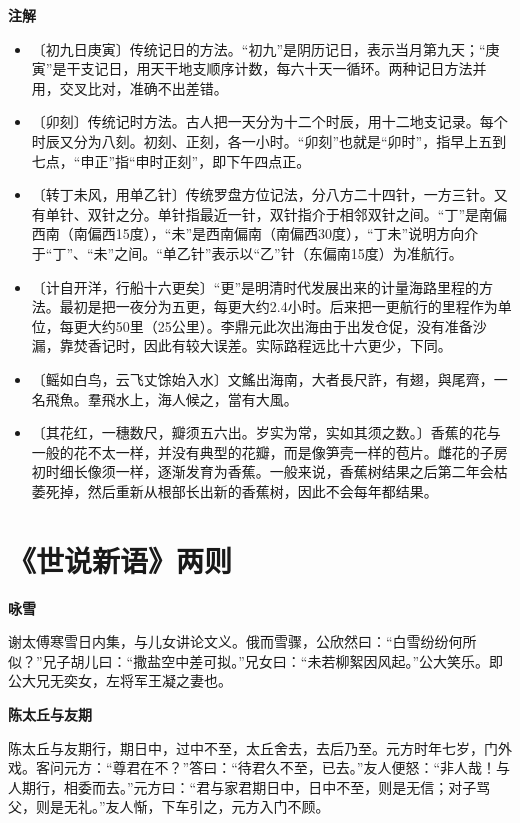 \documentclass[12pt,UTF-8,openany,a4]{ctexbook}
\begin{document}
\newpage

\begin{Large}
    \noindent\textbf{注解}
\end{Large}


\vspace{-1em}

\begin{itemize}
    \setlength\itemsep{-0.2em}
    \item〔初九日庚寅〕{\yiwen 传统记日的方法。“初九”是阴历记日，表示当月第九天；“庚寅”是干支记日，用天干地支顺序计数，每六十天一循环。两种记日方法并用，交叉比对，准确不出差错。}
    \item〔卯刻〕{\yiwen 传统记时方法。古人把一天分为十二个时辰，用十二地支记录。每个时辰又分为八刻。初刻、正刻，各一小时。“卯刻”也就是“卯时”，指早上五到七点，“申正”指“申时正刻”，即下午四点正。}
    \item〔转丁未风，用单乙针〕{\yiwen 传统罗盘方位记法，分八方二十四针，一方三针。又有单针、双针之分。单针指最近一针，双针指介于相邻双针之间。“丁”是南偏西南（南偏西15度），“未”是西南偏南（南偏西30度），“丁未”说明方向介于“丁”、“未”之间。“单乙针”表示以“乙”针（东偏南15度）为准航行。}
    \item〔计自开洋，行船十六更矣〕{\yiwen “更”是明清时代发展出来的计量海路里程的方法。最初是把一夜分为五更，每更大约2.4小时。后来把一更航行的里程作为单位，每更大约50里（25公里）。李鼎元此次出海由于出发仓促，没有准备沙漏，靠焚香记时，因此有较大误差。实际路程远比十六更少，下同。}
    \item〔鳐如白鸟，云飞丈馀始入水〕{\yiwen 文鰩出海南，大者長尺許，有翅，與尾齊，一名飛魚。羣飛水上，海人候之，當有大風。}
    \item〔其花红，一穗数尺，瓣须五六出。岁实为常，实如其须之数。〕{\yiwen 香蕉的花与一般的花不太一样，并没有典型的花瓣，而是像笋壳一样的苞片。雌花的子房初时细长像须一样，逐渐发育为香蕉。一般来说，香蕉树结果之后第二年会枯萎死掉，然后重新从根部长出新的香蕉树，因此不会每年都结果。}
\end{itemize}

\chapter{《世说新语》两则}

\begin{large}
    
    \begin{center}{\Large\textbf{咏雪}}\end{center}
    
    谢太傅寒雪日内集，与儿女讲论文义。俄而雪骤，公欣然曰：“白雪纷纷何所似？”兄子胡儿曰：“撒盐空中差可拟。”兄女曰：“未若柳絮因风起。”公大笑乐。即公大兄无奕女，左将军王凝之妻也。
    
    \begin{center}{\Large\textbf{陈太丘与友期}}\end{center}
    
    陈太丘与友期行，期日中，过中不至，太丘舍去，去后乃至。元方时年七岁，门外戏。客问元方：“尊君在不？”答曰：“待君久不至，已去。”友人便怒：“非人哉！与人期行，相委而去。”元方曰：“君与家君期日中，日中不至，则是无信；对子骂父，则是无礼。”友人惭，下车引之，元方入门不顾。
\end{large}
\end{document}
